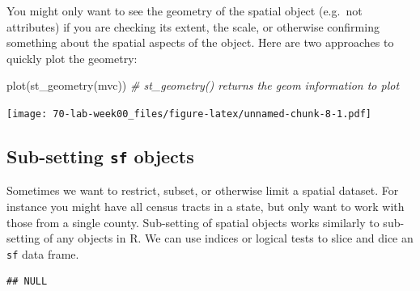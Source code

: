 \documentclass[
]{book}
\newenvironment{Shaded}{\begin{snugshade}}{\end{snugshade}}
\newcommand{\CommentTok}[1]{\textcolor[rgb]{0.56,0.35,0.01}{\textit{#1}}}
\newcommand{\FunctionTok}[1]{\textcolor[rgb]{0.00,0.00,0.00}{#1}}
\newcommand{\NormalTok}[1]{#1}
\newcommand{\SpecialCharTok}[1]{\textcolor[rgb]{0.00,0.00,0.00}{#1}}
\begin{document}
You might only want to see the geometry of the spatial object (e.g.~not attributes) if you are checking its extent, the scale, or otherwise confirming something about the spatial aspects of the object. Here are two approaches to quickly plot the geometry:

\begin{Shaded}
\begin{Highlighting}[]
\FunctionTok{plot}\NormalTok{(}\FunctionTok{st\_geometry}\NormalTok{(mvc)) }\CommentTok{\# st\_geometry() returns the geom information to plot}
\end{Highlighting}
\end{Shaded}

\begin{Shaded}
\end{Shaded}

\texttt{[image: 70-lab-week00\_files/figure-latex/unnamed-chunk-8-1.pdf]}

\hypertarget{sub-setting-sf-objects}{%
\subsection{\texorpdfstring{Sub-setting \texttt{sf} objects}{Sub-setting sf objects}}\label{sub-setting-sf-objects}}

Sometimes we want to restrict, subset, or otherwise limit a spatial dataset. For instance you might have all census tracts in a state, but only want to work with those from a single county. Sub-setting of spatial objects works similarly to sub-setting of any objects in R. We can use indices or logical tests to slice and dice an \texttt{sf} data frame.

\begin{Shaded}
\end{Shaded}

\begin{verbatim}
## NULL
\end{verbatim}
\end{document}
